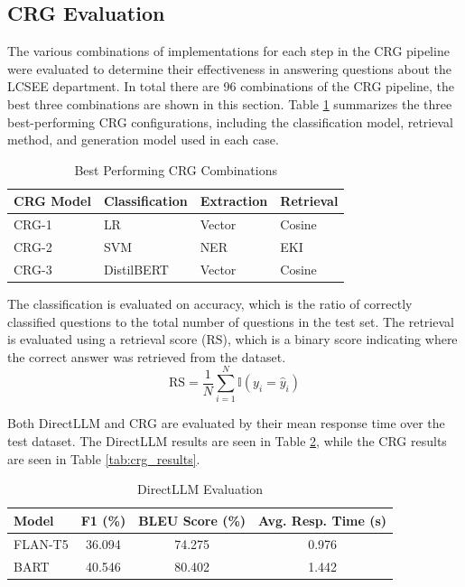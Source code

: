 \documentclass[conference]{IEEEtran}
\begin{document}
\subsection{CRG Evaluation}
The various combinations of implementations for each step in the CRG pipeline were evaluated to determine their effectiveness in answering questions about the LCSEE department.
In total there are 96 combinations of the CRG pipeline, the best three combinations are shown in this section. 
Table \ref{tab:crg_combinations} summarizes the three best-performing CRG configurations, including the classification model, retrieval method, and generation model used in each case.

\begin{table}[!ht]
    \centering
    \caption{Best Performing CRG Combinations}
    \label{tab:crg_combinations}
    \begin{tabular}{l|l|l|l}
        \toprule
        \textbf{CRG Model} & \textbf{Classification} & \textbf{Extraction} & \textbf{Retrieval} \\
        \midrule
        CRG-1 & LR & Vector & Cosine \\
        CRG-2 & SVM & NER & EKI \\
        CRG-3 & DistilBERT & Vector & Cosine \\
        \bottomrule
    \end{tabular}
\end{table}

The classification is evaluated on accuracy, which is the ratio of correctly classified questions to the total number of questions in the test set.
The retrieval is evaluated using a retrieval score ($\text{RS}$), which is a binary score indicating where the correct answer was retrieved from the dataset. 
\begin{equation}
    \text{RS} = \frac{1}{N} \sum_{i=1}^{N} \mathbb{I}(y_i = \hat{y}_i)
\end{equation}

Both DirectLLM and CRG are evaluated by their mean response time over the test dataset.
The DirectLLM results are seen in Table \ref{tab:directllm_results}, while the CRG results are seen in Table \ref{tab:crg_results}.

\begin{table}[!ht]
    \centering
    \caption{DirectLLM Evaluation}
    \label{tab:directllm_results}
    \begin{tabular}{l|c|c|c}
        \toprule
        \textbf{Model} & \textbf{F1 (\%)} & \textbf{BLEU Score (\%)} & \textbf{Avg. Resp. Time (s)} \\
        \midrule
        FLAN-T5        & 36.094                 & 74.275                   & 0.976                          \\
        BART           & 40.546                 & 80.402                   & 1.442                          \\
        \bottomrule
    \end{tabular}
\end{table}
\end{document}
